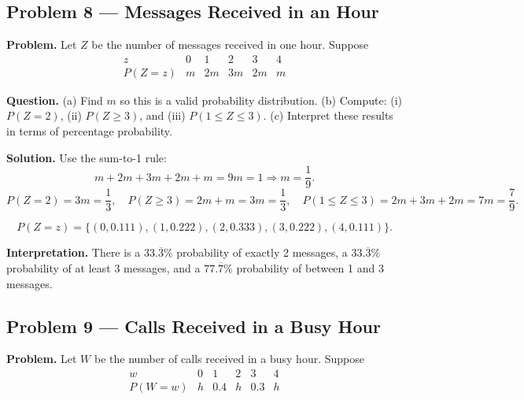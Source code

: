 \begin{ExamProblems}
		\subsection*{Problem 8 — Messages Received in an Hour}
		
		\textbf{Problem.}
		Let $Z$ be the number of messages received in one hour. Suppose
		\[
		\begin{array}{c|ccccc}
			z & 0 & 1 & 2 & 3 & 4\\
			\hline
			P(Z=z) & m & 2m & 3m & 2m & m
		\end{array}
		\]
		
		\textbf{Question.}
		(a) Find $m$ so this is a valid probability distribution.
		(b) Compute: (i) $P(Z=2)$, (ii) $P(Z\ge 3)$, and (iii) $P(1\le Z\le 3)$.
		(c) Interpret these results in terms of percentage probability.
		
		\textbf{Solution.}
		Use the sum-to-1 rule:
		\[
		m+2m+3m+2m+m=9m=1\Rightarrow m=\frac{1}{9}.
		\]
		\[
		P(Z=2)=3m=\frac{1}{3},\quad
		P(Z\ge 3)=2m+m=3m=\frac{1}{3},\quad
		P(1\le Z\le 3)=2m+3m+2m=7m=\frac{7}{9}.
		\]
		
\[
		P(Z=z)=\{(0,0.111),(1,0.222),(2,0.333),(3,0.222),(4,0.111)\}.
		\]
\begin{center}
		\end{center}
\textbf{Interpretation.} There is a $33.\overline{3}\%$ probability of exactly 2 messages, a $33.\overline{3}\%$ probability of at least 3 messages, and a $77.\overline{7}\%$ probability of between 1 and 3 messages.
		
		
		\item
		\subsection*{Problem 9 — Calls Received in a Busy Hour}
		
		\textbf{Problem.}
		Let $W$ be the number of calls received in a busy hour. Suppose
		\[
		\begin{array}{c|ccccc}
			w & 0 & 1 & 2 & 3 & 4\\
			\hline
			P(W=w) & h & 0.4 & h & 0.3 & h
		\end{array}
		\]
		

\end{ExamProblems}
